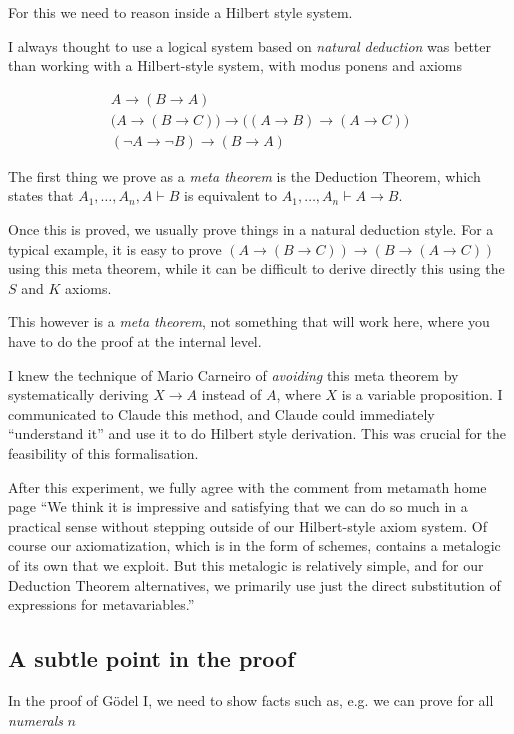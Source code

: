 \documentclass[11pt]{article}
\theoremstyle{plain}
\theoremstyle{definition}
\theoremstyle{remark}
\newcommand{\rta}{\rightarrow}
\begin{document}
For this we need to reason inside a Hilbert style system.

I always thought to use a logical system based on {\em natural deduction} was better than
working with a Hilbert-style system, with modus ponens and axioms 

\[
\begin{array}{l}
A \rta (B \rta A) \\[1ex]
\bigl(A \rta (B \rta C)\bigr)
\rta
\bigl((A \rta B) \rta (A \rta C)\bigr) \\[1ex]
(\neg A \rta \neg B) \rta (B \rta A)
\end{array}
\]

The first thing we prove as a {\em meta theorem} is the Deduction Theorem, which states that
$A_1,\dots,A_n,A\vdash B$ is equivalent to $A_1,\dots,A_n\vdash A\rta B$.

Once this is proved, we usually prove things in a natural deduction style.
For a typical example, it is easy to prove  $(A\rta (B\rta C))\rta (B\rta (A\rta C))$
using this meta theorem, while it can be difficult to derive directly this using the $S$ and $K$
axioms.

This however is a {\em meta theorem}, not something that will work here, where you have to do the
proof at the internal level.

I knew the technique of Mario Carneiro \cite{Carneiro} of {\em avoiding} this meta theorem
by systematically deriving $X\rta A$ instead of $A$, where $X$ is a variable proposition.
I communicated to Claude this method, and Claude could immediately ``understand it'' and use
it to do Hilbert style derivation. This was crucial for the feasibility of this formalisation.

After this experiment, we fully agree with the comment from metamath home page
``We think it is impressive and satisfying that we can do so much in a practical sense without stepping outside of our
Hilbert-style axiom system. Of course our axiomatization, which is in the form of schemes, contains a metalogic of its own that we
exploit. But this metalogic is relatively simple, and for our Deduction Theorem alternatives, we primarily use just the direct
substitution of expressions for metavariables.''

\subsection{A subtle point in the proof}

In the proof of G\"odel I, we need to show facts such as, e.g. 
we can prove for all {\em numerals} $n$
\end{document}
